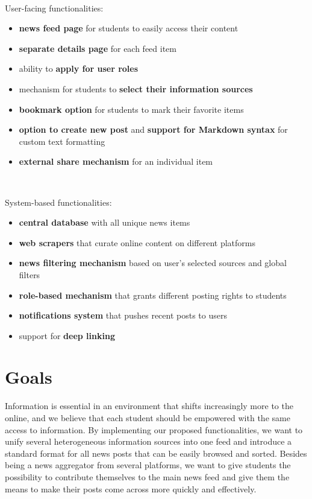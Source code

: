 ~

User-facing functionalities:

\begin{itemize}
    \setlength{\topsep}{0.5pt}
    \setlength{\itemsep}{0.5pt}
    \setlength{\parsep}{0.5pt}
    \item \textbf{news feed page} for students to easily access their content
    \item \textbf{separate details page} for each feed item
    \item ability to \textbf{apply for user roles}
    \item mechanism for students to \textbf{select their information sources}
    \item \textbf{bookmark option} for students to mark their favorite items
    \item \textbf{option to create new post} and \textbf{support for Markdown syntax} for custom text formatting
    \item \textbf{external share mechanism} for an individual item
\end{itemize}

~

System-based functionalities:

\begin{itemize}
    \setlength{\topsep}{0.5pt}
    \setlength{\itemsep}{0.5pt}
    \setlength{\parsep}{0.5pt}
    \item \textbf{central database} with all unique news items
    \item \textbf{web scrapers} that curate online content on different platforms
    \item \textbf{news filtering mechanism} based on user's selected sources and global filters
    \item \textbf{role-based mechanism} that grants different posting rights to students
    \item \textbf{notifications system} that pushes recent posts to users
    \item support for \textbf{deep linking}
\end{itemize}

\section{Goals} \label{1:goals}

Information is essential in an environment that shifts increasingly more to the online, and we believe that each student should be empowered with the same access to information. By implementing our proposed functionalities, we want to unify several heterogeneous information sources into one feed and introduce a standard format for all news posts that can be easily browsed and sorted. Besides being a news aggregator from several platforms, we want to give students the possibility to contribute themselves to the main news feed and give them the means to make their posts come across more quickly and effectively.

